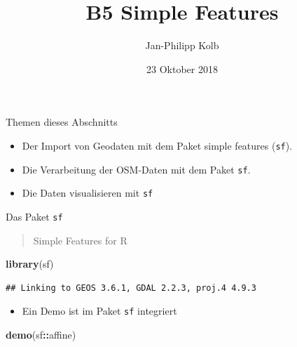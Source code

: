 \documentclass[ignorenonframetext,]{beamer}
\title{B5 Simple Features}
\author{Jan-Philipp Kolb}
\date{23 Oktober 2018}
\newenvironment{Shaded}{\begin{snugshade}}{\end{snugshade}}
\newcommand{\KeywordTok}[1]{\textcolor[rgb]{0.13,0.29,0.53}{\textbf{#1}}}
\newcommand{\NormalTok}[1]{#1}
\newcommand{\OperatorTok}[1]{\textcolor[rgb]{0.81,0.36,0.00}{\textbf{#1}}}
\providecommand{\tightlist}{%
  \setlength{\itemsep}{0pt}\setlength{\parskip}{0pt}}
\begin{document}
\frame{\titlepage}

\begin{frame}[fragile]{Themen dieses Abschnitts}
\protect\hypertarget{themen-dieses-abschnitts}{}

\begin{itemize}
\tightlist
\item
  Der Import von Geodaten mit dem Paket simple features (\texttt{sf}).
\item
  Die Verarbeitung der OSM-Daten mit dem Paket \texttt{sf}.
\item
  Die Daten visualisieren mit \texttt{sf}
\end{itemize}

\end{frame}

\begin{frame}[fragile]{Das Paket \texttt{sf}}
\protect\hypertarget{das-paket-sf}{}

\begin{quote}
Simple Features for R
\end{quote}

\begin{Shaded}
\begin{Highlighting}[]
\KeywordTok{library}\NormalTok{(sf)}
\end{Highlighting}
\end{Shaded}

\begin{verbatim}
## Linking to GEOS 3.6.1, GDAL 2.2.3, proj.4 4.9.3
\end{verbatim}

\begin{itemize}
\tightlist
\item
  Ein Demo ist im Paket \texttt{sf} integriert
\end{itemize}

\begin{Shaded}
\begin{Highlighting}[]
\KeywordTok{demo}\NormalTok{(sf}\OperatorTok{::}\NormalTok{affine)}
\end{Highlighting}
\end{Shaded}


\end{frame}
\end{document}
